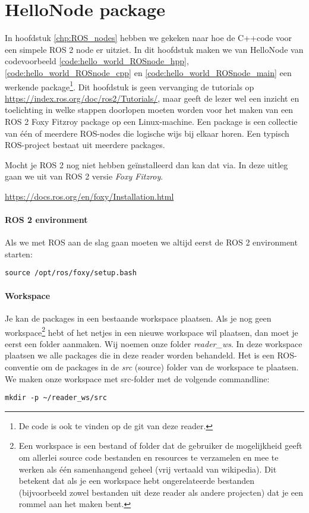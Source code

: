 \chapter{HelloNode package}
\label{chp:HelloNode_package}
In hoofdstuk \ref{chp:ROS_nodes} hebben we gekeken naar hoe de C++code voor een simpele ROS 2 node er uitziet. In dit hoofdstuk maken we van HelloNode van codevoorbeeld \ref{code:hello_world_ROSnode_hpp}, \ref{code:hello_world_ROSnode_cpp} en \ref{code:hello_world_ROSnode_main} een werkende package\footnote{De code is ook te vinden op de git van deze reader.}. Dit hoofdstuk is geen vervanging de tutorials op \url{https://index.ros.org/doc/ros2/Tutorials/}, maar geeft de lezer wel een inzicht en toelichting in welke stappen doorlopen moeten worden voor het maken van een ROS 2 Foxy Fitzroy package op een Linux-machine. Een package is een collectie van één of meerdere ROS-nodes die logische wijs bij elkaar horen. Een typisch ROS-project bestaat uit meerdere packages.

Mocht je ROS 2 nog niet hebben geïnstalleerd dan kan dat via. In deze uitleg gaan we uit van ROS 2 versie \textit{Foxy Fitzroy}.
\begin{center}
    \url{https://docs.ros.org/en/foxy/Installation.html}
\end{center}

\subsubsection{ROS 2 environment}
Als we met ROS aan de slag gaan moeten we altijd eerst de ROS 2 environment starten:
\begin{lstlisting}[style=DOS, caption={}, firstnumber=0, label={}]
 source /opt/ros/foxy/setup.bash
\end{lstlisting}

\subsubsection{Workspace}
Je kan de packages in een bestaande workspace plaatsen. Als je nog geen workspace\footnote{Een workspace is een bestand of folder dat de gebruiker de mogelijkheid geeft om allerlei source code bestanden en resources te verzamelen en mee te werken als \'e\'en samenhangend geheel (vrij vertaald van wikipedia). Dit betekent dat als je een workspace hebt ongerelateerde bestanden (bijvoorbeeld zowel bestanden uit deze reader als andere projecten) dat je een rommel aan het maken bent.} hebt of het netjes in een nieuwe workspace wil plaatsen, dan moet je eerst een folder aanmaken. Wij noemen onze folder \textit{reader\_ws}. In deze workspace plaatsen we alle packages die in deze reader worden behandeld. Het is een ROS-conventie om de packages in de \textit{src} (source) folder van de workspace te plaatsen. We maken onze workspace met src-folder met de volgende commandline:
\begin{lstlisting}[style=DOS, caption={}, firstnumber=0, label={}]
 mkdir -p ~/reader_ws/src
\end{lstlisting}

